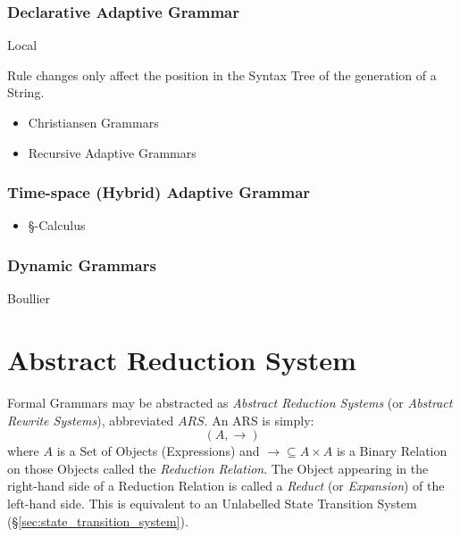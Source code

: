\subsubsection{Declarative Adaptive Grammar}
\label{sec:declarative_adaptive}

Local

Rule changes only affect the position in the Syntax Tree of the
generation of a String.

\begin{itemize}
  \item Christiansen Grammars
  \item Recursive Adaptive Grammars
\end{itemize}



\subsubsection{Time-space (Hybrid) Adaptive Grammar}
\label{sec:timespace_adaptive}

\begin{itemize}
  \item \S-Calculus
\end{itemize}



\subsubsection{Dynamic Grammars}\label{sec:dynamic_grammar}

Boullier\cite{boullier94}



\section{Abstract Reduction System}\label{sec:abstract_rewrite}

Formal Grammars may be abstracted as \emph{Abstract Reduction Systems}
(or \emph{Abstract Rewrite Systems}), abbreviated $ARS$. An ARS is
simply:
\[
  (A,\rightarrow)
\]
where $A$ is a Set of Objects (Expressions) and $\rightarrow \subseteq
A \times A$ is a Binary Relation on those Objects called the
\emph{Reduction Relation}. The Object appearing in the right-hand side
of a Reduction Relation is called a \emph{Reduct} (or
\emph{Expansion}) of the left-hand side. This is equivalent to an
Unlabelled State Transition System
(\S\ref{sec:state_transition_system}).

